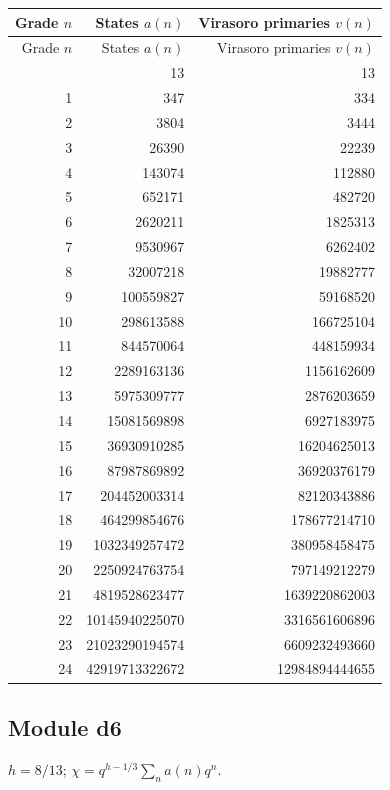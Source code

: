 \begingroup\small
\setlength{\tabcolsep}{5pt}
\begin{longtable}{@{}rrr@{}}
\toprule
Grade $n$ & States $a(n)$ & Virasoro primaries $v(n)$\\
\midrule\endfirsthead
\toprule
Grade $n$ & States $a(n)$ & Virasoro primaries $v(n)$\\
\midrule\endhead
\bottomrule\endfoot
0 & 13 & 13\\
1 & 347 & 334\\
2 & 3804 & 3444\\
3 & 26390 & 22239\\
4 & 143074 & 112880\\
5 & 652171 & 482720\\
6 & 2620211 & 1825313\\
7 & 9530967 & 6262402\\
8 & 32007218 & 19882777\\
9 & 100559827 & 59168520\\
10 & 298613588 & 166725104\\
11 & 844570064 & 448159934\\
12 & 2289163136 & 1156162609\\
13 & 5975309777 & 2876203659\\
14 & 15081569898 & 6927183975\\
15 & 36930910285 & 16204625013\\
16 & 87987869892 & 36920376179\\
17 & 204452003314 & 82120343886\\
18 & 464299854676 & 178677214710\\
19 & 1032349257472 & 380958458475\\
20 & 2250924763754 & 797149212279\\
21 & 4819528623477 & 1639220862003\\
22 & 10145940225070 & 3316561606896\\
23 & 21023290194574 & 6609232493660\\
24 & 42919713322672 & 12984894444655\\
\end{longtable}
\endgroup

\subsection{Module d6}
$h=8/13$; $\chi=q^{h-1/3}\sum_n a(n)q^n$.


